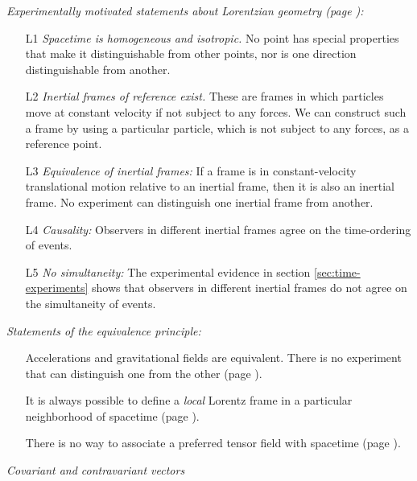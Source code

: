 \documentclass{genrel}
\begin{document}
\emph{Experimentally motivated statements about Lorentzian geometry (page \pageref{lorentz-geometry-postulates}):}\\\label{lorentz-summary}
\begin{itemize}\label{lorentz-geometry-postulates}
\item[L1] \emph{Spacetime is homogeneous and isotropic.} No point has special properties that make it distinguishable from other points, nor is one
                  direction distinguishable from another.
\item[L2] \emph{Inertial frames of reference exist.} These are frames in which particles move at constant velocity if not subject to any forces.
                  We can construct such a frame by using a particular particle, which is not subject to any forces, as a reference point.
\item[L3] \emph{Equivalence of inertial frames:} If a frame is in constant-velocity translational motion relative to an inertial frame, then it is also an inertial frame.
              No experiment can distinguish one inertial frame from another.
\item[L4] \emph{Causality:} Observers in different inertial frames agree on the time-ordering of events.
\item[L5] \emph{No simultaneity:} The experimental evidence in section \ref{sec:time-experiments} shows that
           observers in different inertial frames do not agree on the simultaneity of events.
\end{itemize}

\emph{Statements of the equivalence principle:}\\\label{equivalence-principle-summary}
\begin{itemize}
\item[] Accelerations and gravitational fields are equivalent. There is no experiment that can distinguish one from
the other (page \pageref{equivalence-a-and-g}).
\item[] It is always possible to define a \emph{local} Lorentz
frame in a particular neighborhood of spacetime (page \pageref{equivalence-locally-lorentzian}).
\item[] There is no way to associate a preferred tensor field with spacetime (page \pageref{equivalence-no-preferred-field}).
\end{itemize}

\emph{Covariant and contravariant vectors}\\\label{vec-covec-summary}
\end{document}
